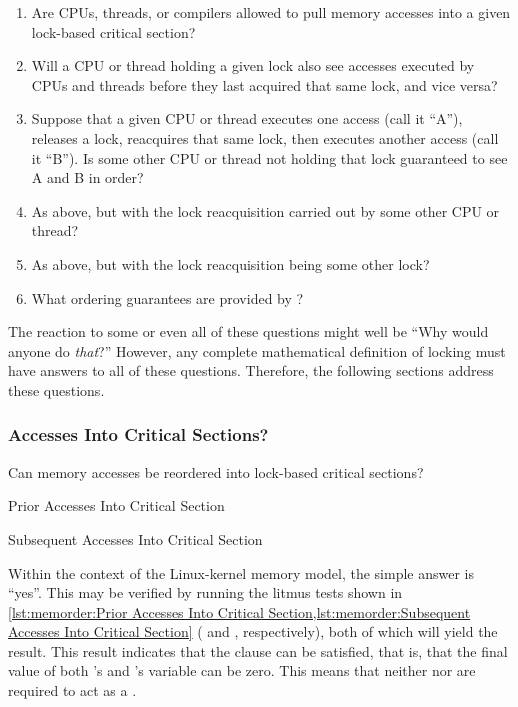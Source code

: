 \begin{enumerate}
\item	Are CPUs, threads, or compilers allowed to pull memory accesses
	into a given lock-based critical section?
\item	Will a CPU or thread holding a given lock also see accesses
	executed by CPUs and threads before they last acquired that
	same lock, and vice versa?
\item	Suppose that a given CPU or thread executes one access
	(call it ``A''), releases a lock, reacquires that same lock,
	then executes another access (call it ``B'')\@.
	Is some other CPU or thread not holding that lock guaranteed to
	see A and B in order?
\item	As above, but with the lock reacquisition carried out by some
	other CPU or thread?
\item	As above, but with the lock reacquisition being some other lock?
\item	What ordering guarantees are provided by ?
\end{enumerate}

The reaction to some or even all of these questions might well be ``Why
would anyone do \emph{that}?''
However, any complete mathematical definition of locking must have
answers to all of these questions.
Therefore, the following sections address these questions.

\subsubsection{Accesses Into Critical Sections?}
\label{sec:memorder:Accesses Into Critical Sections?}

Can memory accesses be reordered into lock-based critical sections?

\begin{listing}

\caption{Prior Accesses Into Critical Section}
\label{lst:memorder:Prior Accesses Into Critical Section}
\end{listing}

\begin{listing}

\caption{Subsequent Accesses Into Critical Section}
\label{lst:memorder:Subsequent Accesses Into Critical Section}
\end{listing}

Within the context of the Linux-kernel memory model, the simple answer
is ``yes''.
This may be verified by running the litmus tests shown in
\cref{lst:memorder:Prior Accesses Into Critical Section,lst:memorder:Subsequent Accesses Into Critical Section}
( and ,
respectively), both of which will yield the  result.
This result indicates that the  clause can be satisfied, that
is, that the final value of both 's and 's  variable
can be zero.
This means that neither  nor 
are required to act as a .


